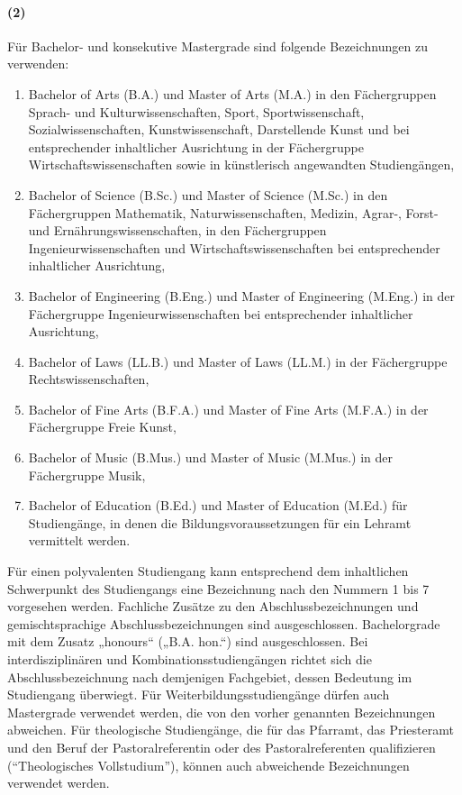 \documentclass[a4paper]{scrartcl}
\begin{document}
\paragraph{(2)}
Für Bachelor- und konsekutive Mastergrade sind folgende Bezeichnungen
zu verwenden:
\begin{enumerate}
\item Bachelor of Arts (B.A.) und Master of Arts (M.A.) in den Fächergruppen Sprach- und Kulturwissenschaften, Sport, Sportwissenschaft, Sozialwissenschaften, Kunstwissenschaft, Darstellende Kunst und bei entsprechender inhaltlicher Ausrichtung in der Fächergruppe Wirtschaftswissenschaften sowie in künstlerisch angewandten Studiengängen,
\item Bachelor of Science (B.Sc.) und Master of Science (M.Sc.) in den Fächergruppen Mathematik, Naturwissenschaften, Medizin, Agrar-, Forst- und Ernährungswissenschaften, in den Fächergruppen Ingenieurwissenschaften und Wirtschaftswissenschaften bei entsprechender inhaltlicher Ausrichtung,
\item Bachelor of Engineering (B.Eng.) und Master of Engineering (M.Eng.) in der Fächergruppe Ingenieurwissenschaften bei entsprechender inhaltlicher Ausrichtung,
\item Bachelor of Laws (LL.B.) und Master of Laws (LL.M.) in der Fächergruppe Rechtswissenschaften,
\item Bachelor of Fine Arts (B.F.A.) und Master of Fine Arts (M.F.A.) in der Fächergruppe Freie Kunst,
\item Bachelor of Music (B.Mus.) und Master of Music (M.Mus.) in der
Fächergruppe Musik,
\item Bachelor of Education (B.Ed.) und Master of Education (M.Ed.) für Studiengänge, in denen die Bildungsvoraussetzungen für ein Lehramt vermittelt werden.
\end{enumerate}
Für einen polyvalenten Studiengang kann entsprechend dem inhaltlichen Schwerpunkt des Studiengangs eine Bezeichnung nach den Nummern 1 bis 7 vorgesehen werden. Fachliche Zusätze zu den Abschlussbezeichnungen und gemischtsprachige Abschlussbezeichnungen sind ausgeschlossen. Bachelorgrade mit dem Zusatz „honours“ („B.A. hon.“) sind ausgeschlossen. Bei interdisziplinären und Kombinationsstudiengängen richtet sich die Abschlussbezeichnung nach demjenigen Fachgebiet, dessen Bedeutung im Studiengang überwiegt. Für  Weiterbildungsstudiengänge dürfen auch Mastergrade verwendet werden, die von den vorher genannten Bezeichnungen abweichen. Für theologische Studiengänge, die für das Pfarramt, das Priesteramt und den Beruf der Pastoralreferentin oder des Pastoralreferenten qualifizieren (\enquote{Theologisches Vollstudium}), können auch abweichende Bezeichnungen verwendet werden.
\end{document}
